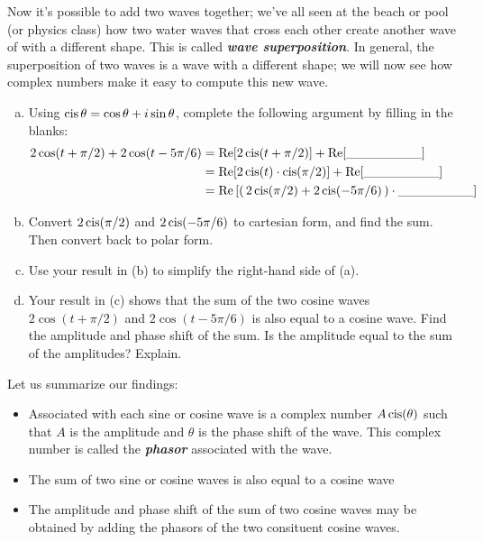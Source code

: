 Now it's possible to add two waves together; we've all seen at the beach or pool (or physics class) how two water waves that cross each other create another wave of with a different shape. This is called {\bf \emph{wave superposition}}. In general, the superposition of two waves is a wave with a different shape; we will now see how complex numbers make it easy to compute this new wave.

\begin{exercise}\label{exercise:complex:45}
\begin{enumerate}[(a)]
\item
Using $\operatorname{cis} \theta = \cos \theta + i\sin \theta$, complete the following argument by filling in the blanks:
\begin{align*} 
2 \cos(t + \pi/2) + 2 \cos(t - 5\pi/6) &= \mathrm{Re}[2 \operatorname{cis} (t + \pi/2)] + \mathrm{Re}[\_\_\_\_\_\_\_\_]\\
&= \mathrm{Re}[2 \operatorname{cis} (t) \cdot \operatorname{cis}(\pi/2)] + \textrm{Re}[\_\_\_\_\_\_\_\_]\\
&= \mathrm{ Re} \left[\left(\, 2 \operatorname{cis}(\pi/2) + 2 \operatorname{cis}(-5\pi/6) \, \right) \cdot \_\_\_\_\_\_\_\_ \right] 
\end{align*}
\item
Convert $2 \operatorname{cis}(\pi/2)$ and $2 \operatorname{cis}(-5\pi/6)$ to cartesian form, and find the sum. Then convert back to polar form.
\item
Use your result in (b) to simplify the right-hand side of (a).
\item
Your result in (c) shows that the sum of the two cosine waves  $2\cos(t + \pi/2)$ and $2 \cos(t - 5\pi/6)$ is also equal to a cosine wave.  Find the amplitude and phase shift of the sum. Is the amplitude equal to the sum of the amplitudes? Explain.
\end{enumerate}
\end{exercise}

Let us summarize our findings:
\begin{itemize}
\item
Associated with each sine or cosine wave is a complex number $A \operatorname{cis}( \theta) $ such that $A$ is the amplitude and $\theta$ is the phase shift of the wave. This complex number is called the \textbf{\emph{phasor}} associated with the wave.
\item
The sum of two sine or cosine waves is also equal to a cosine wave
\item
The amplitude and phase shift of the sum of two cosine waves may be obtained by adding the phasors of the two consituent cosine waves.
\end{itemize}

